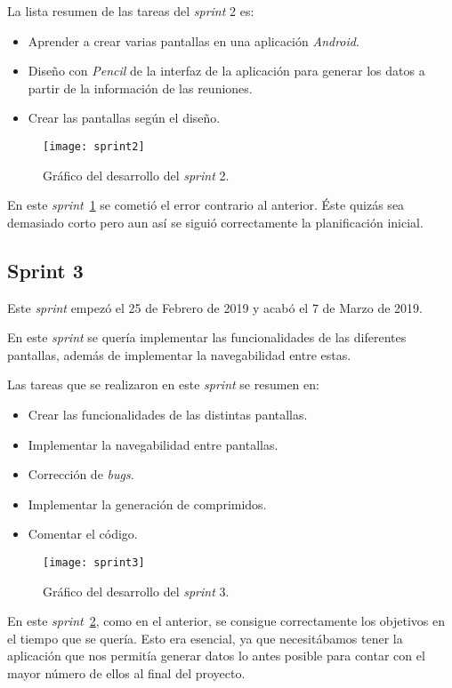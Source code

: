 La lista resumen de las tareas del \textit{sprint} 2 es:
\begin{itemize}
	\item Aprender a crear varias pantallas en una aplicación \textit{Android}.
	\item Diseño con \textit{Pencil} de la interfaz de la aplicación para generar los datos a partir de la información de las reuniones.
	\item Crear las pantallas según el diseño.
\end{itemize}

\begin{figure}
	\centering
	\texttt{[image: sprint2]}
	\caption{Gráfico del desarrollo del \textit{sprint} 2.}
	\label{fig:sprint2}
\end{figure}

En este \textit{sprint}~\ref{fig:sprint2} se cometió el error contrario al anterior. Éste quizás sea demasiado corto pero aun así se siguió correctamente la planificación inicial.

\subsection{Sprint 3}
Este \textit{sprint} empezó el 25 de Febrero de 2019 y acabó el 7 de Marzo de 2019.

En este \textit{sprint} se quería implementar las funcionalidades de las diferentes pantallas, además de implementar la navegabilidad entre estas.

Las tareas que se realizaron en este \textit{sprint} se resumen en:
\begin{itemize}
	\item Crear las funcionalidades de las distintas pantallas.
	\item Implementar la navegabilidad entre pantallas.
	\item Corrección de \textit{bugs}.
	\item Implementar la generación de comprimidos.
	\item Comentar el código.
\end{itemize}

\begin{figure}
	\centering
	\texttt{[image: sprint3]}
	\caption{Gráfico del desarrollo del \textit{sprint} 3.}
	\label{fig:sprint3}
\end{figure}

En este \textit{sprint}~\ref{fig:sprint3}, como en el anterior, se consigue correctamente los objetivos en el tiempo que se quería. Esto era esencial, ya que necesitábamos tener la aplicación que nos permitía generar datos lo antes posible para contar con el mayor número de ellos al final del proyecto.

